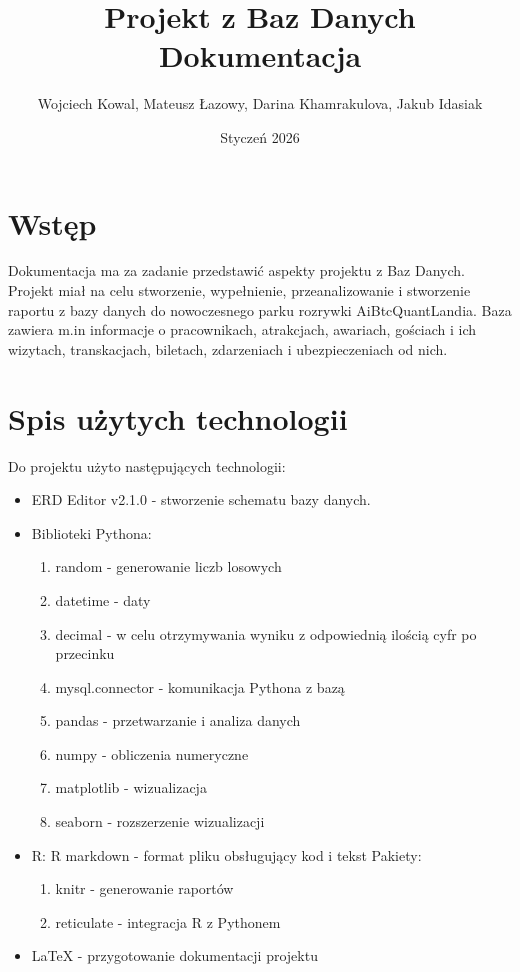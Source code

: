 \documentclass{article}
\begin{document}
\title{\Huge Projekt z Baz Danych \\Dokumentacja}
\author{\LARGE Wojciech Kowal, Mateusz Łazowy, Darina Khamrakulova, Jakub Idasiak}
\date{\Large Styczeń 2026}
\maketitle
\Large
\tableofcontents
\newpage
\section{\LARGE Wstęp}
Dokumentacja ma za zadanie przedstawić aspekty projektu z Baz Danych. Projekt miał na celu stworzenie, wypełnienie, przeanalizowanie i stworzenie raportu z bazy danych do nowoczesnego parku rozrywki AiBtcQuantLandia. Baza zawiera m.in informacje o pracownikach, atrakcjach, awariach, gościach i ich wizytach, transkacjach, biletach, zdarzeniach i ubezpieczeniach od nich.
\section{\LARGE Spis użytych technologii}
Do projektu użyto następujących technologii:
\label{sec:technologie}
\begin{itemize}
    \item ERD Editor v2.1.0 - stworzenie schematu bazy danych.
    \item Biblioteki Pythona:
    \begin{enumerate}
        \item random - generowanie liczb losowych
        \item datetime - daty
        \item decimal - w celu otrzymywania wyniku z odpowiednią ilością cyfr po przecinku
        \item mysql.connector - komunikacja Pythona z bazą
        \item pandas - przetwarzanie i analiza danych
        \item numpy - obliczenia numeryczne
        \item matplotlib - wizualizacja
        \item seaborn - rozszerzenie wizualizacji
    \end{enumerate}
    \item R:
    \newline
    R markdown - format pliku obsługujący kod i tekst
    \newline
    Pakiety:
    \begin{enumerate}
        \item knitr - generowanie raportów
        \item reticulate - integracja R z Pythonem
    \end{enumerate}
    \item LaTeX - przygotowanie dokumentacji projektu
\end{itemize}
\end{document}
